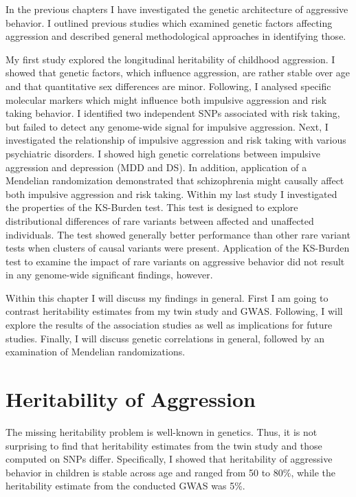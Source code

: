 
In the previous chapters I have investigated the genetic architecture of aggressive behavior.
I outlined previous studies which examined genetic factors affecting aggression and described general methodological approaches in identifying those.

My first study explored the longitudinal heritability of childhood aggression.
I showed that genetic factors, which influence aggression, are rather stable over age and that quantitative sex differences are minor.
Following, I analysed specific molecular markers which might influence both impulsive aggression and risk taking behavior.
I identified two independent SNPs associated with risk taking, but failed to detect any genome-wide signal for impulsive aggression.
Next, I investigated the relationship of impulsive aggression and risk taking with various psychiatric disorders.
I showed  high genetic correlations between impulsive aggression and depression (MDD and DS).
In addition, application of a Mendelian randomization demonstrated that schizophrenia might causally affect both impulsive aggression and risk taking.
Within my last study I investigated the properties of the KS-Burden test.
This test is designed to explore distributional differences of rare variants between affected and unaffected individuals.
The test showed generally better performance than other rare variant tests when clusters of causal variants were present.
Application of the KS-Burden test to examine the impact of rare variants on aggressive behavior did not result in any genome-wide significant findings, however.

Within this chapter I will discuss my findings in general.
First I am going to contrast heritability estimates from  my twin study and GWAS\@.
Following, I will explore the results of the association studies as well as implications for future studies.
Finally, I will discuss genetic correlations in general, followed by an examination of Mendelian randomizations.

\section{Heritability of Aggression}
\label{sec:heritability_of_aggression}

The missing heritability problem is well-known in genetics.
Thus, it is not surprising to find that heritability estimates from the twin study and those computed on SNPs differ.
Specifically, I showed that heritability of aggressive behavior in children is stable across age and ranged from 50 to 80\%, while the heritability estimate from the conducted GWAS was 5\%. 

